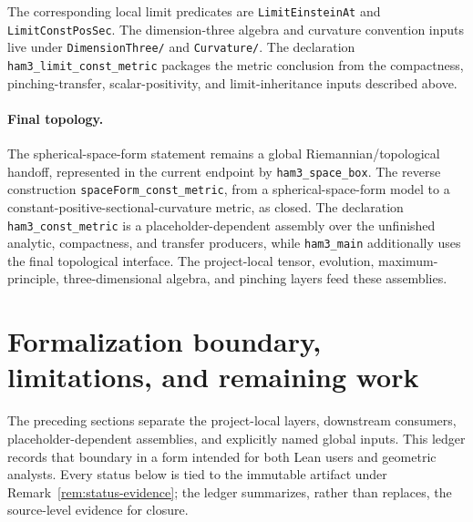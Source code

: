 \documentclass[11pt]{article}
\theoremstyle{plain}
\theoremstyle{definition}
\theoremstyle{remark}
\newcommand{\leanref}[1]{\nolinkurl{#1}}
\newcommand{\leanfile}[1]{\nolinkurl{#1}}
\newcommand{\rfdir}[1]{\leanfile{#1/}}
\begin{document}
The corresponding local limit predicates are \leanref{LimitEinsteinAt} and
\leanref{LimitConstPosSec}.  The dimension-three algebra and curvature
convention inputs live under \rfdir{DimensionThree} and \rfdir{Curvature}.
The declaration \leanref{ham3_limit_const_metric} packages the metric conclusion
from the compactness, pinching-transfer,
scalar-positivity, and limit-inheritance inputs described above.

\paragraph{Final topology.}
The spherical-space-form statement remains a global Riemannian/topological
handoff, represented in the current endpoint by \leanref{ham3_space_box}.  The
reverse construction \leanref{spaceForm_const_metric}, from a
spherical-space-form model to a
constant-positive-sectional-curvature metric, as closed.  The declaration
\leanref{ham3_const_metric} is a placeholder-dependent assembly over the
unfinished analytic, compactness, and transfer producers, while
\leanref{ham3_main} additionally uses the final topological interface.  The
project-local tensor, evolution, maximum-principle,
three-dimensional algebra, and pinching layers feed these assemblies.


\section{Formalization boundary, limitations, and remaining work}
\label{sec:dependency-ledger}

The preceding sections separate the project-local layers, downstream
consumers, placeholder-dependent assemblies, and explicitly named global
inputs.  This ledger records that boundary in a form intended for both Lean
users and geometric analysts.  Every status below is tied to the immutable
artifact under Remark~\ref{rem:status-evidence}; the ledger summarizes, rather
than replaces, the source-level evidence for closure.
\end{document}
